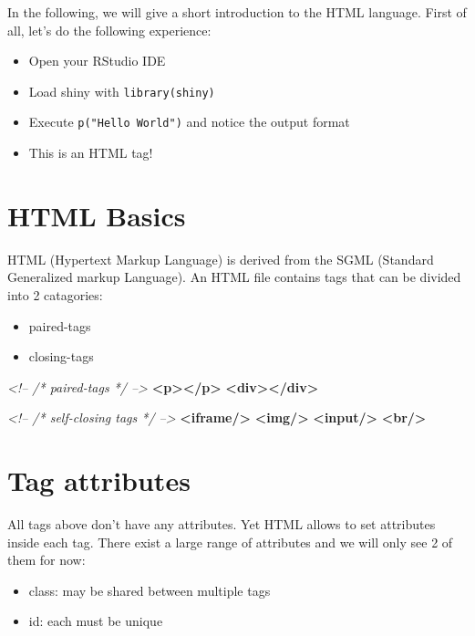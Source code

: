 \documentclass[]{book}
\newenvironment{Shaded}{\begin{snugshade}}{\end{snugshade}}
\newcommand{\CommentTok}[1]{\textcolor[rgb]{0.56,0.35,0.01}{\textit{#1}}}
\newcommand{\KeywordTok}[1]{\textcolor[rgb]{0.13,0.29,0.53}{\textbf{#1}}}
\providecommand{\tightlist}{%
  \setlength{\itemsep}{0pt}\setlength{\parskip}{0pt}}
\begin{document}
In the following, we will give a short introduction to the HTML language. First of all, let's do the following experience:

\begin{itemize}
\tightlist
\item
  Open your RStudio IDE
\item
  Load shiny with \texttt{library(shiny)}
\item
  Execute \texttt{p("Hello\ World")} and notice the output format
\item
  This is an HTML tag!
\end{itemize}

\hypertarget{html-basics}{%
\section{HTML Basics}\label{html-basics}}

HTML (Hypertext Markup Language) is derived from the SGML (Standard Generalized markup Language). An HTML file contains tags that can be divided into 2 catagories:

\begin{itemize}
\tightlist
\item
  paired-tags
\item
  closing-tags
\end{itemize}

\begin{Shaded}
\begin{Highlighting}[]
\CommentTok{<!-- /* paired-tags */ -->}
\KeywordTok{<p></p>}
\KeywordTok{<div></div>}

\CommentTok{<!-- /* self-closing tags */ -->}
\KeywordTok{<iframe/>}
\KeywordTok{<img/>}
\KeywordTok{<input/>}
\KeywordTok{<br/>}
\end{Highlighting}
\end{Shaded}

\hypertarget{tag-attributes}{%
\section{Tag attributes}\label{tag-attributes}}

All tags above don't have any attributes. Yet HTML allows to set attributes inside each tag. There exist a large range of attributes and we will only see 2 of them for now:

\begin{itemize}
\tightlist
\item
  class: may be shared between multiple tags
\item
  id: each must be unique
\end{itemize}
\end{document}
